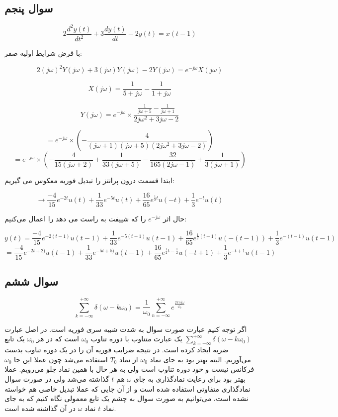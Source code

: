 \documentclass[12pt]{article}
\begin{document}
 
\subsection{سوال پنجم}

$$
2 \frac{d^{2} y(t)}{d t^{2}}+3 \frac{d y(t)}{d t}-2 y(t)=x(t-1)
$$

با فرض شرایط اولیه صفر:

$$2 (j\omega)^2 Y(j\omega) + 3 (j\omega) Y(j\omega) - 2 Y(j\omega) = e^{-j\omega} X(j \omega)$$

$$X(j \omega) = \frac{1}{5 + j\omega} - \frac{1}{1 +j \omega}$$


$$Y(j \omega) = e^{- j \omega} \times \frac{\frac{1}{j\omega+5}-\frac{1}{j\omega+1}}{2 j\omega^2+3 j\omega-2}$$

$$= e^{-j \omega}\times( -\frac{4}{(j\omega+1) (j\omega+5) \left(2 j\omega^2+3 j\omega-2\right)})$$
$$= e^{-j \omega} \times( -\frac{4}{15 (j\omega+2)}+\frac{1}{33 (j\omega+5)}-\frac{32}{165 (2 j\omega-1)}+\frac{1}{3 (j\omega+1)})$$

ابتدا قسمت درون پرانتز را تبدیل فوریه معکوس می گیریم:

$$\rightarrow \frac{-4}{15} e^{-2t}u(t) + \frac{1}{33} e^{-5t}u(t) + \frac{16}{65} e^{\frac{1}{2} t} u(-t) + \frac{1}{3} e^{-t}u(t) $$

حال اثر $e^{-j \omega}$ را که شییفت به راست می دهد را اعمال می‌کنیم:


$$y(t) = \frac{-4}{15} e^{-2(t-1)}u(t-1) + \frac{1}{33} e^{-5(t-1)}u(t-1) + \frac{16}{65} e^{\frac{1}{2} (t-1)} u(-(t-1)) + \frac{1}{3} e^{-(t-1)}u(t-1) $$
$$=\frac{-4}{15} e^{-2t+2)}u(t-1) + \frac{1}{33} e^{-5t+5)}u(t-1) + \frac{16}{65} e^{\frac{1}{2} t-\frac{1}{2}} u(-t+1) + \frac{1}{3} e^{-t+1}u(t-1)$$

\newpage
\subsection{سوال ششم}

$$
\sum_{k=-\infty}^{+\infty} \delta\left(\omega-k \omega_{0}\right)=\frac{1}{\omega_{0}} \sum_{n=-\infty}^{+\infty} e^{\frac{2 \pi n j \omega}{\omega_{0}}}
$$

اگر توجه کنیم عبارت صورت سوال به شدت شبیه سری فوریه است. در اصل عبارت
$\sum_{k=-\infty}^{+\infty} \delta\left(\omega-k \omega_{0}\right)$
یک عبارت متناوب با دوره تناوب $\omega_0$ است که در هر $\omega_0$ یک تابع ضربه ایجاد کرده است. در نتیجه ضرایب فوریه آن را در یک دوره تناوب بدست می‌آوریم. البته بهتر بود به جای نماد $\omega_0$ از نماد $T_0$ استفاده می‌شد چون عملا این جا $\omega_0$ فرکانس نیست و خود دوره تناوب است ولی به هر حال با همین نماد جلو می‌رویم. عملا بهتر بود برای رعایت نمادگذاری به جای $\omega$ هم $t$ گذاشته می‌شد ولی در صورت سوال نمادگذاری متفاوتی استفاده شده است و از آن جایی که عملا تبدیل خاصی هم خواسته نشده است، می‌توانیم به صورت سوال به چشم یک تابع معمولی نگاه کنیم که به جای نماد $t$ نماد $\omega$ در آن گذاشته شده است.
\end{document}
